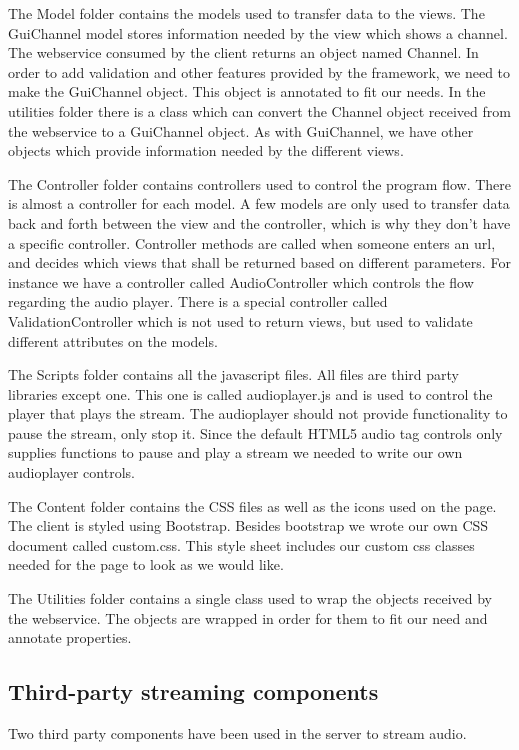 \documentclass[a4paper,11pt,report]{article}
\begin{document}
The Model folder contains the models used to transfer data to the views. The GuiChannel model stores information needed by the view which shows a channel. The webservice consumed by the client returns an object named Channel. In order to add validation and other features provided by the framework, we need to make the GuiChannel object. This object is annotated to fit our needs. In the utilities folder there is a class which can convert the Channel object received from the webservice to a GuiChannel object.
As with GuiChannel, we have other objects which provide information needed by the different views.

The Controller folder contains controllers used to control the program flow. There is almost a controller for each model. A few models are only used to transfer data back and forth between the view and the controller, which is why they don’t have a specific controller. Controller methods are called when someone enters an url, and decides which views that shall be returned based on different parameters. For instance we have a controller called AudioController which controls the flow regarding the audio player. There is a special controller called ValidationController which is not used to return views, but used to validate different attributes on the models.

The Scripts folder contains all the javascript files. All files are third party libraries except one. This one is called audioplayer.js and is used to control the player that plays the stream. The audioplayer should not provide functionality to pause the stream, only stop it. Since the default HTML5 audio tag controls only supplies functions to pause and play a stream we needed to write our own audioplayer controls.

The Content folder contains the CSS files as well as the icons used on the page. The client is styled using Bootstrap. Besides bootstrap we wrote our own CSS document called custom.css. This style sheet includes our custom css classes needed for the page to look as we would like.

The Utilities folder contains a single class used to wrap the objects received by the webservice. The objects are wrapped in order for them to fit our need and annotate properties.

\subsection{Third-party streaming components}
Two third party components have been used in the server to stream audio.
\end{document}
